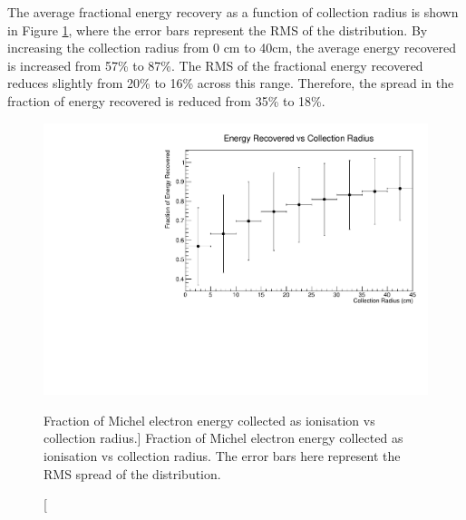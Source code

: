 The average fractional energy recovery as a function of collection radius is
shown in Figure \ref{fig:frac_v_radius}, where the error bars represent the RMS
of the distribution. By increasing the collection radius from 0 cm to 40cm, 
the average energy recovered is increased from 57\% to 87\%. The RMS of the
fractional energy recovered reduces slightly from 20\% to 16\% across this
range. Therefore, the spread in the fraction of energy recovered is reduced 
from 35\% to 18\%. 
\begin{figure}
	\centering
	\includegraphics[width=\textwidth]{figures/energy_recovery_v_radius.pdf}
	\caption
	[Fraction of Michel electron energy collected as ionisation vs collection 
	radius.]
	{Fraction of Michel electron energy collected as ionisation vs collection 
	radius. The error bars here represent the RMS spread of the distribution. }
	\label{fig:frac_v_radius}
\end{figure}

